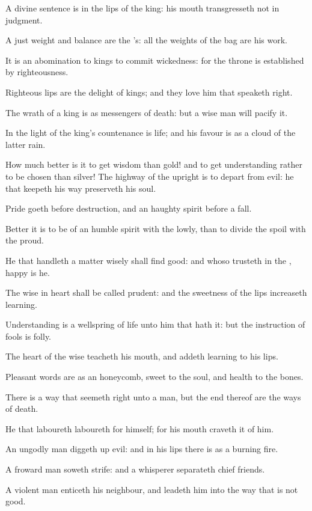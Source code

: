 \verse A divine sentence is in the lips of the king: his mouth transgresseth not in judgment.

\verse A just weight and balance are the \LORD's: all the weights of the bag are his work.

\verse It is an abomination to kings to commit wickedness: for the throne is established by righteousness.

\verse Righteous lips are the delight of kings; and they love him that speaketh right.

\verse The wrath of a king is as messengers of death: but a wise man will pacify it.

\verse In the light of the king's countenance is life; and his favour is as a cloud of the latter rain.

\verse How much better is it to get wisdom than gold! and to get understanding rather to be chosen than silver!  \verse The highway of the upright is to depart from evil: he that keepeth his way preserveth his soul.

\verse Pride goeth before destruction, and an haughty spirit before a fall.

\verse Better it is to be of an humble spirit with the lowly, than to divide the spoil with the proud.

\verse He that handleth a matter wisely shall find good: and whoso trusteth in the \LORD, happy is he.

\verse The wise in heart shall be called prudent: and the sweetness of the lips increaseth learning.

\verse Understanding is a wellspring of life unto him that hath it: but the instruction of fools is folly.

\verse The heart of the wise teacheth his mouth, and addeth learning to his lips.

\verse Pleasant words are as an honeycomb, sweet to the soul, and health to the bones.

\verse There is a way that seemeth right unto a man, but the end thereof are the ways of death.

\verse He that laboureth laboureth for himself; for his mouth craveth it of him.

\verse An ungodly man diggeth up evil: and in his lips there is as a burning fire.

\verse A froward man soweth strife: and a whisperer separateth chief friends.

\verse A violent man enticeth his neighbour, and leadeth him into the way that is not good.

